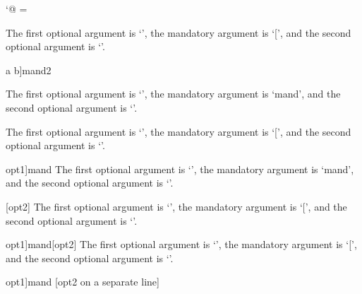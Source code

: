 
\ifx\undefined\eplain  \fi

\catcode`@ = 
\def\foo{\@getoptionalarg\finfoo}
\def\finfoo#1{%
  \edef\firstarg{\@optionalarg}
  \edef\mandatoryarg{#1}%
  \@getoptionalarg\finfinfoo
}
\def\finfinfoo{%
  The first optional argument is `\firstarg', the mandatory argument
  is `\mandatoryarg', and the second optional argument is `\@optionalarg'.
  \par
}

\loggingall
\foo[a {\cite[p.10]{xyz}} b]{mand2}

\foo{mand}
\foo[opt1]{mand}
\foo{mand}[opt2]
\foo[opt1]{mand}[opt2]
\foo[opt1]{mand}
  [opt2 on a separate line]

\bye
